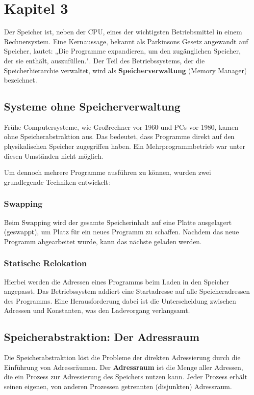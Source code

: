 \chapter{Kapitel 3}

Der Speicher ist, neben der CPU, eines der wichtigsten Betriebsmittel in einem
Rechnersystem. Eine Kernaussage, bekannt als Parkinsons Gesetz angewandt auf
Speicher, lautet: „Die Programme expandieren, um den zugänglichen Speicher, der
sie enthält, auszufüllen.". Der Teil des Betriebssystems, der die
Speicherhierarchie verwaltet, wird als \textbf{Speicherverwaltung} (Memory
Manager) bezeichnet.

\section{Systeme ohne Speicherverwaltung}

Frühe Computersysteme, wie Großrechner vor 1960 und PCs vor 1980, kamen ohne
Speicherabstraktion aus. Das bedeutet, dass Programme direkt auf den
physikalischen Speicher zugegriffen haben. Ein Mehrprogrammbetrieb war unter
diesen Umständen nicht möglich.

Um dennoch mehrere Programme ausführen zu können, wurden zwei grundlegende
Techniken entwickelt:

\subsection{Swapping}
Beim Swapping wird der gesamte Speicherinhalt auf eine Platte ausgelagert
(geswappt), um Platz für ein neues Programm zu schaffen. Nachdem das neue
Programm abgearbeitet wurde, kann das nächste geladen werden.

\subsection{Statische Relokation}
Hierbei werden die Adressen eines Programms beim Laden in den Speicher
angepasst. Das Betriebssystem addiert eine Startadresse auf alle
Speicheradressen des Programms. Eine Herausforderung dabei ist die
Unterscheidung zwischen Adressen und Konstanten, was den Ladevorgang
verlangsamt.

\section{Speicherabstraktion: Der Adressraum}

Die Speicherabstraktion löst die Probleme der direkten Adressierung durch die
Einführung von Adressräumen. Der \textbf{Adressraum} ist die Menge aller
Adressen, die ein Prozess zur Adressierung des Speichers nutzen kann. Jeder
Prozess erhält seinen eigenen, von anderen Prozessen getrennten (disjunkten)
Adressraum.

